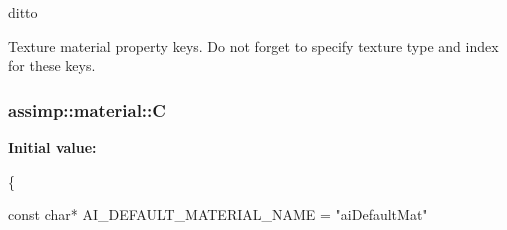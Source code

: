 ditto 

Texture material property keys. Do not forget to specify texture type and index for these keys. \hypertarget{namespaceassimp_1_1material_aa0244e47e49ad5c13d1133205802f28d}{
\subsubsection[{C}]{\setlength{\rightskip}{0pt plus 5cm}assimp\+::material\+::\+C}}\label{namespaceassimp_1_1material_aa0244e47e49ad5c13d1133205802f28d}
{\bfseries Initial value\+:}
\begin{DoxyCode}
\{
   
   \textcolor{keyword}{const} \textcolor{keywordtype}{char}* AI\_DEFAULT\_MATERIAL\_NAME = \textcolor{stringliteral}{"aiDefaultMat"}
\end{DoxyCode}
